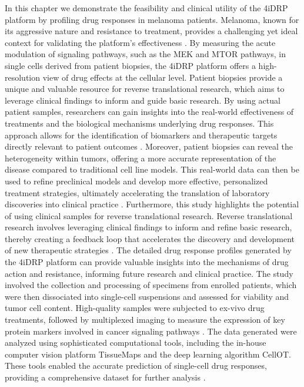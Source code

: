 In this chapter we demonstrate the feasibility and clinical utility of the 4iDRP platform by profiling drug responses in melanoma patients.
Melanoma, known for its aggressive nature and resistance to treatment, provides a challenging yet ideal context for validating the platform's effectiveness \cite{}.
By measuring the acute modulation of signaling pathways, such as the MEK and MTOR pathways, in single cells derived from patient biopsies, the 4iDRP platform offers a high-resolution view of drug effects at the cellular level.
Patient biopsies provide a unique and valuable resource for reverse translational research, which aims to leverage clinical findings to inform and guide basic research.
By using actual patient samples, researchers can gain insights into the real-world effectiveness of treatments and the biological mechanisms underlying drug responses.
This approach allows for the identification of biomarkers and therapeutic targets directly relevant to patient outcomes \cite{}.
Moreover, patient biopsies can reveal the heterogeneity within tumors, offering a more accurate representation of the disease compared to traditional cell line models.
This real-world data can then be used to refine preclinical models and develop more effective, personalized treatment strategies, ultimately accelerating the translation of laboratory discoveries into clinical practice \cite{}.
Furthermore, this study highlights the potential of using clinical samples for reverse translational research.
Reverse translational research involves leveraging clinical findings to inform and refine basic research, thereby creating a feedback loop that accelerates the discovery and development of new therapeutic strategies \cite{}.
The detailed drug response profiles generated by the 4iDRP platform can provide valuable insights into the mechanisms of drug action and resistance, informing future research and clinical practice.
The study involved the collection and processing of specimens from enrolled patients, which were then dissociated into single-cell suspensions and assessed for viability and tumor cell content.
High-quality samples were subjected to ex-vivo drug treatments, followed by multiplexed imaging to measure the expression of key protein markers involved in cancer signaling pathways \cite{}.
The data generated were analyzed using sophisticated computational tools, including the in-house computer vision platform TissueMaps and the deep learning algorithm CellOT.
These tools enabled the accurate prediction of single-cell drug responses, providing a comprehensive dataset for further analysis \cite{}.
